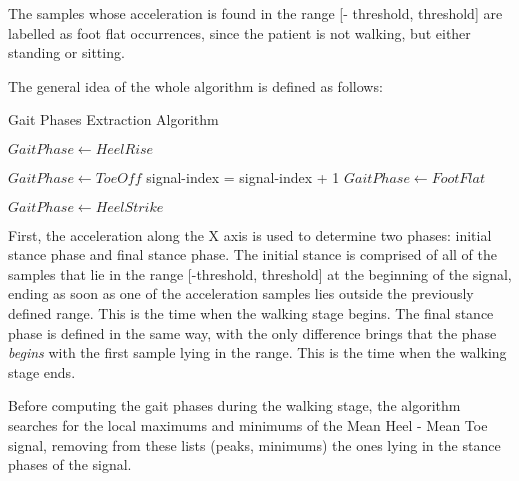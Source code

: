 The samples whose acceleration is found in the range [- threshold, threshold] are labelled as foot flat occurrences, since the patient is not walking, but either standing or sitting.

The general idea of the whole algorithm is defined as follows:

\begin{algorithm}
\caption{Gait Phases Extraction Algorithm}\label{alg:cap}
\begin{algorithmic}[1]


        \State $Gait Phase \gets Heel Rise$
    \EndWhile
    \EndIf


        \State $Gait Phase \gets Toe Off$
        \State signal-index = signal-index + 1
    \EndWhile
    \EndIf
\EndIf
{}
        \State $Gait Phase \gets Foot Flat$
    \EndWhile
    \EndIf

        \State $Gait Phase \gets Heel Strike$
    \EndWhile
    \EndIf
\EndIf
\EndWhile
\end{algorithmic}
\end{algorithm}

First, the acceleration along the X axis is used to determine two phases: initial stance phase and final stance phase. The initial stance is comprised of all of the samples that lie in the range [-threshold, threshold] at the beginning of the signal, ending as soon as one of the acceleration samples lies outside the previously defined range. This is the time when the walking stage begins. The final stance phase is defined in the same way, with the only difference brings that the phase \textit{begins} with the first sample lying in the range. This is the time when the walking stage ends.

Before computing the gait phases during the walking stage, the algorithm searches for the local maximums and minimums of the Mean Heel - Mean Toe signal, removing from these lists (peaks, minimums) the ones lying in the stance phases of the signal.

